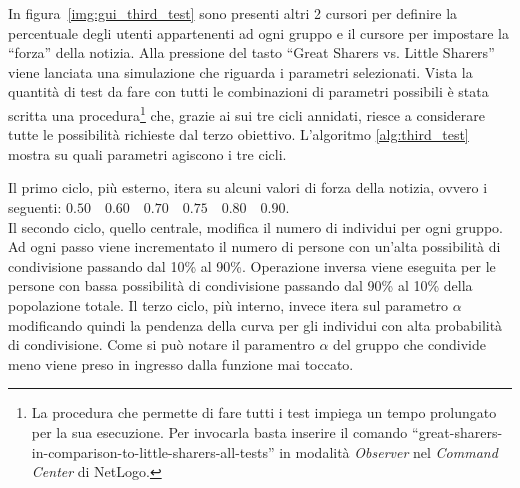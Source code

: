 In figura~\ref{img:gui_third_test} sono presenti altri 2 cursori per definire la percentuale degli utenti appartenenti ad ogni gruppo e 
il cursore per impostare la ``forza'' della notizia.
Alla pressione del tasto ``Great Sharers vs. Little Sharers'' viene lanciata una simulazione che riguarda i parametri selezionati.
Vista la quantità di test da fare con tutti le combinazioni di parametri possibili è stata scritta una procedura\footnote{\scriptsize 
La procedura che permette di fare tutti i test impiega un tempo prolungato per la sua esecuzione.
Per invocarla basta inserire il comando ``great-sharers-in-comparison-to-little-sharers-all-tests'' in modalità \emph{Observer} nel \emph{Command Center} di NetLogo.
} che, grazie ai sui tre cicli annidati, riesce a considerare tutte le possibilità richieste dal terzo obiettivo.
L'algoritmo \ref{alg:third_test} mostra su quali parametri agiscono i tre cicli.

Il primo ciclo, più esterno, itera su alcuni valori di forza della notizia, 
ovvero i seguenti: $0.50 \quad 0.60 \quad 0.70 \quad 0.75 \quad 0.80 \quad 0.90$.\\
Il secondo ciclo, quello centrale, modifica il numero di individui per ogni gruppo. 
Ad ogni passo viene incrementato il numero di persone con un'alta possibilità di condivisione 
passando dal 10\% al 90\%. Operazione inversa viene eseguita per le persone con bassa possibilità di 
condivisione passando dal 90\% al 10\% della popolazione totale.
Il terzo ciclo, più interno, invece itera sul parametro $\alpha$ modificando quindi la pendenza della 
curva per gli individui con alta probabilità di condivisione.
Come si può notare il paramentro $\alpha$ del gruppo che condivide meno viene preso in ingresso dalla funzione 
mai toccato.

